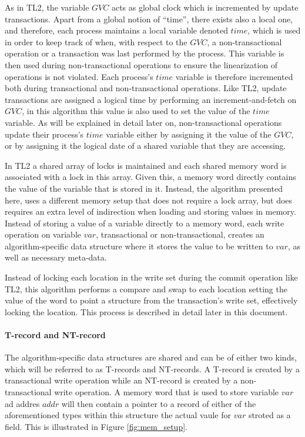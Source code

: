 \documentclass[11pt,letterpaper]{article}
\begin{document}
As in TL2,  the variable $\mathit{GVC}$
acts as  global  clock  which  is incremented  by update transactions.
 Apart from a global   notion of ``time'', there exists also
a local one, and therefore, each process maintains a local  
variable denoted $\mathit{time}$,  which is used in order to keep  
track of when, with
respect to the $\mathit{GVC}$, a non-transactional operation 
or a transaction was last performed by
the  process.
This variable is then used during non-transactional operations to ensure
the linearization of operations is not violated.
Each  process's  $\mathit{time}$   variable is   
therefore incremented
both during transactional and non-transactional operations.
Like TL2, update  transactions are assigned a logical time by
performing an increment-and-fetch
on  $\mathit{GVC}$, in this algorithm this value is also used to set the
value of the $\mathit{time}$ variable.  As  will  be explained  in  detail  later  on,
non-transactional operations update  
their process's $\mathit{time}$ variable either by  assigning it the value of 
the $\mathit{GVC}$, or by assigning it the  
logical date of a shared variable that they are accessing.

In TL2 a  shared array of locks is maintained and each
shared memory word  
is associated with a lock in this array. Given this, a memory
word directly contains  
the value of the variable that  is stored in it.
Instead, the algorithm presented here, uses
a  different memory setup that does not require a lock array, but does requires
an extra level of indirection when loading and storing values in memory.
Instead of storing a value of a variable directly to a memory word,
each  write  operation  on   variable  $\mathit{var}$,   transactional  or
non-transactional, creates an algorithm-specific data  
structure where  it stores  the value to  be written to  $\mathit{var}$, as
well as necessary meta-data.

Instead of locking each location in the write set during the commit operation like TL2, this algorithm
performs a compare and swap to each location setting the value of the word to point
a structure from the transaction's write set, effectively locking the location.
This process is described in detail later in this document.

\paragraph{T-record  and NT-record}
The  algorithm-specific  data structures  are shared  and  can be  of 
either  two  kinds, which will be referred   to as T-records and NT-records. 
A T-record is created by a transactional write operation while an 
NT-record is created by a  non-transactional write operation. A memory word
that is used to store  
variable $\mathit{var}$ ad addres $\mathit{addr}$ will then contain a pointer to a  
record of either of the  aforementioned types within this structure
the actual vaule for  $\mathit{var}$ stroted as a field. 
This  is illustrated in Figure  \ref{fig:mem_setup}.
\end{document}
